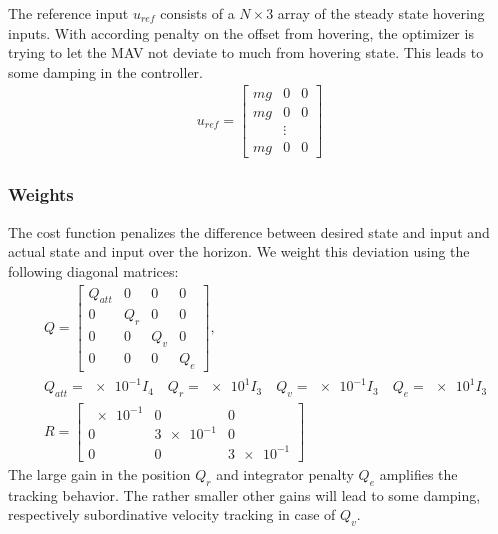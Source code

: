 The reference input $u_{ref}$ consists of a $N\times3$ array of the steady state hovering inputs. With according penalty on the offset from hovering, the optimizer is trying to let the MAV not deviate to much from hovering state. This leads to some damping in the controller.
\begin{align}
u_{ref} = \begin{bmatrix}
mg & 0 & 0 \\
mg & 0 & 0 \\
  & \vdots &  \\
mg & 0 & 0 
\end{bmatrix}
\end{align}
\subsubsection{Weights}
The cost function penalizes the difference between desired state and input and actual state and input over the horizon. We weight this deviation using the following diagonal matrices:
\begin{align}
&Q = \begin{bmatrix}
Q_{att} & 0 & 0 & 0 \\
0 & Q_{r} & 0 & 0 \\
0 & 0 & Q_{v} & 0 \\
0 & 0 & 0 & Q_{e}
\end{bmatrix},\\
&Q_{att}= \num{e-1} I_4  \quad  Q_{r} = \num{e1} I_3 \quad
Q_{v} = \num{e-1} I_3  \quad Q_{e} = \num{e1} I_3 \nonumber \\
&R = \begin{bmatrix}
\num{e-1} & 0 & 0 \\
0 & \num{3e-1} & 0 \\
0 & 0 & \num{3e-1}
\end{bmatrix}
\end{align}
The large gain in the position $Q_{r}$ and integrator penalty $Q_{e}$ amplifies the tracking behavior. The rather smaller other gains will lead to some damping, respectively subordinative velocity tracking in case of $Q_{v}$.

